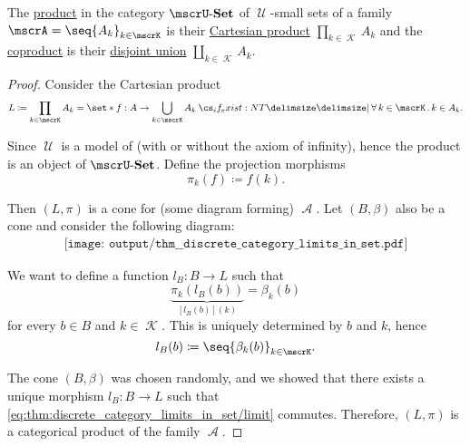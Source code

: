 \begin{proposition}\label{thm:discrete_category_limits_in_set}
  The \hyperref[def:discrete_category_limits]{product} in the category \hyperref[def:category_of_small_sets]{\( \ucat{Set} \)} of \( \mscrU \)-small sets of a family \( \mscrA = \seq{ A_k }_{k \in \mscrK} \) is their \hyperref[def:cartesian_product/product]{Cartesian product} \( \prod_{k \in \mscrK} A_k \) and the \hyperref[def:discrete_category_limits]{coproduct} is their \hyperref[def:disjoint_union]{disjoint union} \( \coprod_{k \in \mscrK} A_k \).
\end{proposition}
\begin{proof}
   Consider the Cartesian product
  \begin{equation*}
    L \coloneqq \prod_{k \in \mscrK} A_k = \set*{ f: A \to \bigcup_{k \in \mscrK} A_k \given* \qforall {k \in \mscrK} k \in A_k }.
  \end{equation*}

  Since \( \mscrU \) is a model of  (with or without the axiom of infinity), hence the product is an object of \( \ucat{Set} \). Define the projection morphisms
  \begin{equation*}
    \pi_k(f) \coloneqq f(k).
  \end{equation*}

  Then \( (L, \pi) \) is a cone for (some diagram forming) \( \mscrA \). Let \( (B, \beta) \) also be a cone and consider the following diagram:
  \begin{equation}\label{eq:thm:discrete_category_limits_in_set/limit}
    \begin{aligned}
      \texttt{[image: output/thm\_\_discrete\_category\_limits\_in\_set.pdf]}
    \end{aligned}
  \end{equation}

  We want to define a function \( l_B: B \to L \) such that
  \begin{equation*}
    \underbrace{ \pi_k(l_B(b)) }_{[l_B(b)](k)} = \beta_k(b)
  \end{equation*}
  for every \( b \in B \) and \( k \in \mscrK \). This is uniquely determined by \( b \) and \( k \), hence
  \begin{equation*}
    l_B(b) \coloneqq \seq{ \beta_k(b) }_{k \in \mscrK}.
  \end{equation*}

  The cone \( (B, \beta) \) was chosen randomly, and we showed that there exists a unique morphism \( l_B: B \to L \) such that \eqref{eq:thm:discrete_category_limits_in_set/limit} commutes. Therefore, \( (L, \pi) \) is a categorical product of the family \( \mscrA \).


\end{proof}
